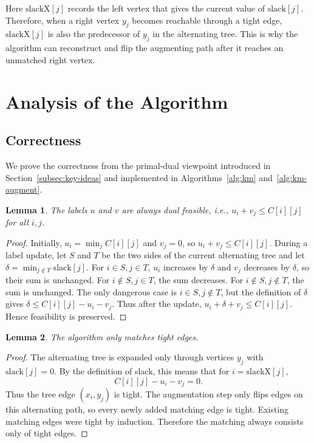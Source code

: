 \documentclass[acmsmall,nonacm]{acmart}
\theoremstyle{plain}
\newtheorem{lemma}{Lemma}
\theoremstyle{remark}
\begin{document}
Here $\text{slackX}[j]$ records the left vertex that gives the current value of
$\text{slack}[j]$. Therefore, when a right vertex $y_j$ becomes reachable
through a tight edge, $\text{slackX}[j]$ is also the predecessor of $y_j$ in the
alternating tree. This is why the algorithm can reconstruct and flip the
augmenting path after it reaches an unmatched right vertex.

\section{Analysis of the Algorithm} 
\label{sec:analysis}

\subsection{Correctness} 
\label{subsec:correctness}

We prove the correctness from the primal-dual viewpoint introduced in
Section~\ref{subsec:key-ideas} and implemented in Algorithms~\ref{alg:km}
and~\ref{alg:km-augment}.

\begin{lemma}
\label{lem:dual-feasible}
The labels $u$ and $v$ are always dual feasible, i.e.,
$u_i+v_j \leq C[i][j]$ for all $i,j$.
\end{lemma}

\begin{proof}
Initially, $u_i=\min_j C[i][j]$ and $v_j=0$, so $u_i+v_j\leq C[i][j]$.
During a label update, let $S$ and $T$ be the two sides of the current
alternating tree and let $\delta=\min_{j\notin T}\text{slack}[j]$. For
$i\in S,j\in T$, $u_i$ increases by $\delta$ and $v_j$ decreases by $\delta$,
so their sum is unchanged. For $i\notin S,j\in T$, the sum decreases. For
$i\notin S,j\notin T$, the sum is unchanged. The only dangerous case is
$i\in S,j\notin T$, but the definition of $\delta$ gives
$\delta\leq C[i][j]-u_i-v_j$. Thus after the update,
$u_i+\delta+v_j\leq C[i][j]$. Hence feasibility is preserved.
\end{proof}

\begin{lemma}
\label{lem:tight-edges}
The algorithm only matches tight edges.
\end{lemma}

\begin{proof}
The alternating tree is expanded only through vertices $y_j$ with
$\text{slack}[j]=0$. By the definition of slack, this means that for
$i=\text{slackX}[j]$,
\[
    C[i][j]-u_i-v_j=0.
\]
Thus the tree edge $(x_i,y_j)$ is tight. The augmentation step only flips edges
on this alternating path, so every newly added matching edge is tight. Existing
matching edges were tight by induction. Therefore the matching always consists
only of tight edges.
\end{proof}
\end{document}
